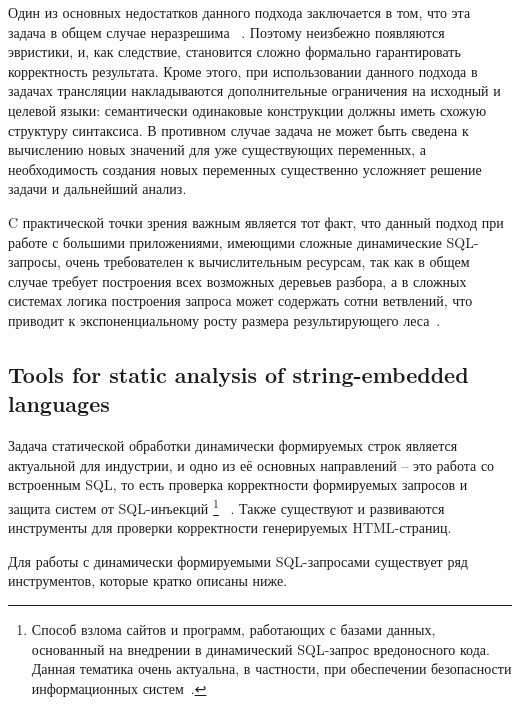 \documentclass{llncs}
\begin{document}
Один из основных недостатков данного подхода заключается в том, что эта задача в общем случае неразрешима ~\cite{ALVOR2}. Поэтому неизбежно появляются эвристики, и, как следствие, становится сложно формально гарантировать корректность результата. Кроме этого, при использовании данного подхода в задачах  трансляции накладываются дополнительные ограничения на исходный и целевой языки: семантически одинаковые конструкции должны иметь схожую структуру синтаксиса. В противном случае задача не может быть сведена к вычислению новых значений для уже существующих переменных, а необходимость создания новых переменных существенно усложняет решение задачи и дальнейший анализ.

C практической точки зрения важным является тот факт, что данный подход при работе с  большими приложениями, имеющими  сложные динамические SQL-запросы, очень требователен к вычислительным ресурсам, так как в общем случае требует построения всех возможных деревьев разбора, а в сложных системах логика построения запроса может содержать сотни ветвлений, что приводит к экспоненциальному росту размера результирующего леса~\cite{TiunovaUIInt}. 

\subsection{Tools for static analysis of string-embedded languages}

Задача статической обработки динамически формируемых строк является актуальной для индустрии, и одно из её основных направлений  -- это работа со встроенным SQL, то есть проверка корректности формируемых запросов и защита систем от SQL-инъекций \footnote{Способ взлома сайтов и программ, работающих с базами данных, основанный на  внедрении в динамический SQL-запрос вредоносного кода. Данная тематика очень актуальна, в частности, при обеспечении безопасности информационных систем~\cite{SAForInject}.} ~\cite{SAForInject}. Также существуют и развиваются инструменты для проверки корректности генерируемых HTML-страниц.

Для работы с динамически формируемыми SQL-запросами существует ряд инструментов, которые кратко описаны ниже.
\end{document}
